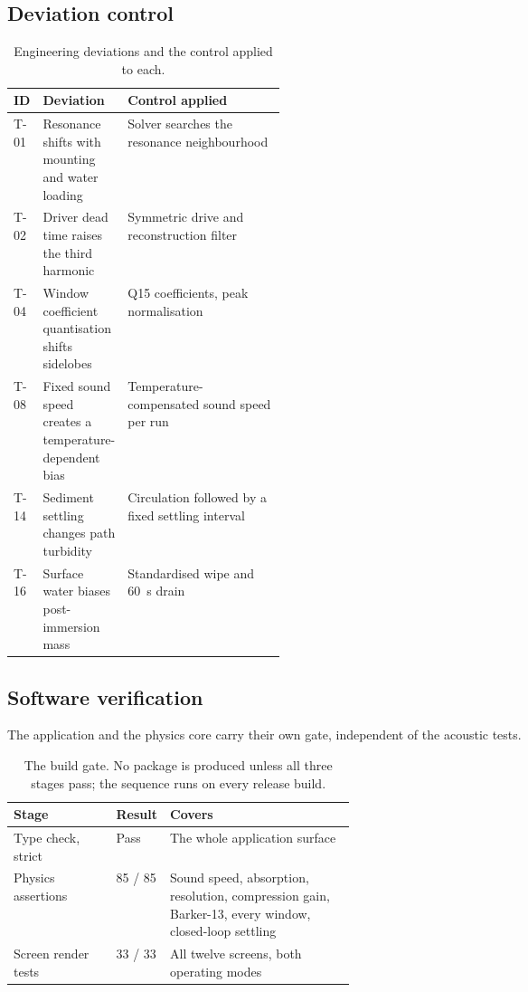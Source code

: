 \documentclass[11pt,a4paper]{article}
\begin{document}
\subsection{Deviation control}

\begin{table}[htbp]
\centering
\small
\begin{tabularx}{\linewidth}{L{0.07\linewidth}L{0.28\linewidth}Y}
\toprule
\textbf{ID} & \textbf{Deviation} & \textbf{Control applied} \\
\midrule
T-01 & Resonance shifts with mounting and water loading & Solver searches the resonance neighbourhood \\
T-02 & Driver dead time raises the third harmonic & Symmetric drive and reconstruction filter \\
T-04 & Window coefficient quantisation shifts sidelobes & Q15 coefficients, peak normalisation \\
T-08 & Fixed sound speed creates a temperature-dependent bias & Temperature-compensated sound speed per run \\
T-14 & Sediment settling changes path turbidity & Circulation followed by a fixed settling interval \\
T-16 & Surface water biases post-immersion mass & Standardised wipe and \SI{60}{\second} drain \\
\bottomrule
\end{tabularx}
\caption{Engineering deviations and the control applied to each.}
\end{table}

\subsection{Software verification}

The application and the physics core carry their own gate, independent of the
acoustic tests.

\begin{table}[htbp]
\centering
\small
\begin{tabularx}{\linewidth}{L{0.30\linewidth}L{0.14\linewidth}Y}
\toprule
\textbf{Stage} & \textbf{Result} & \textbf{Covers} \\
\midrule
Type check, strict & Pass & The whole application surface \\
Physics assertions & 85 / 85 & Sound speed, absorption, resolution, compression gain, Barker-13, every window, closed-loop settling \\
Screen render tests & 33 / 33 & All twelve screens, both operating modes \\
\bottomrule
\end{tabularx}
\caption{The build gate. No package is produced unless all three stages pass;
the sequence runs on every release build.}
\label{tab:gate}
\end{table}
\end{document}

